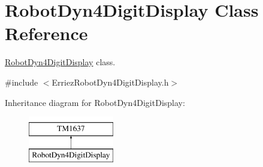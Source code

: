 \hypertarget{class_robot_dyn4_digit_display}{}\section{Robot\+Dyn4\+Digit\+Display Class Reference}
\label{class_robot_dyn4_digit_display}


\hyperlink{class_robot_dyn4_digit_display}{Robot\+Dyn4\+Digit\+Display} class.  




{\ttfamily \#include $<$Erriez\+Robot\+Dyn4\+Digit\+Display.\+h$>$}

Inheritance diagram for Robot\+Dyn4\+Digit\+Display\+:\begin{figure}[H]
\begin{center}
\leavevmode
\includegraphics[height=2.000000cm]{class_robot_dyn4_digit_display}
\end{center}
\end{figure}
